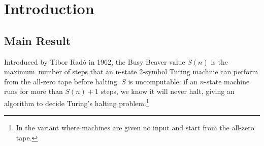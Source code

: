 \documentclass[sigconf,screen]{acmart}
\theoremstyle{definition} %
\numberwithin{equation}{section}
\theoremstyle{definition} %
\newcommand{\radofull}{Tibor Rad\'o\xspace}
\begin{document}
\author{Th\'eo Zimmermann}

\begin{abstract}
    The Busy Beaver value $S(n)$ is the maximum~number of steps that an n-state 2-symbol Turing machine can perform from the all-zero tape before halting. $S$ was historically introduced by \radofull in 1962 as one of the simplest examples of an uncomputable function.

    We prove that $S(5) = 47,176,870$ using the Coq proof assistant. The proof enumerates 181,385,789 Turing machines with 5 states and, for each machine, decides whether it halts or not.
    Our result marks the first determination of a new Busy Beaver value in over 40 years and the first Busy Beaver value ever to be formally verified, attesting to the effectiveness of massively collaborative online research (\url{bbchallenge.org}).
\end{abstract}

\maketitle

\newcommand{\noncomput}{uncomputable\xspace}
\newcommand{\BBfull}{Busy Beaver\xspace}
\newcommand{\Coq}{Coq\xspace}
\newcommand{\ie}{i.e.~}
\newcommand{\eg}{e.g.~}


\section{Introduction}\label{sec:intro}

\subsection{Main Result}\label{sec:intro:mainresults}

\newcommand{\CoqProofReleaseURL}{\url{https://github.com/ccz181078/Coq-BB5}}


Introduced by \radofull in 1962, the Busy Beaver value $S(n)$ is the maximum~number of steps that an n-state 2-symbol Turing machine can perform from the all-zero tape before halting. $S$ is \noncomput: if an $n$-state machine runs for more than $S(n)+1$ steps, we know it will never halt, giving an algorithm to decide Turing's halting problem.\footnote{In the variant where machines are given no input and start from the all-zero tape.}
\end{document}
